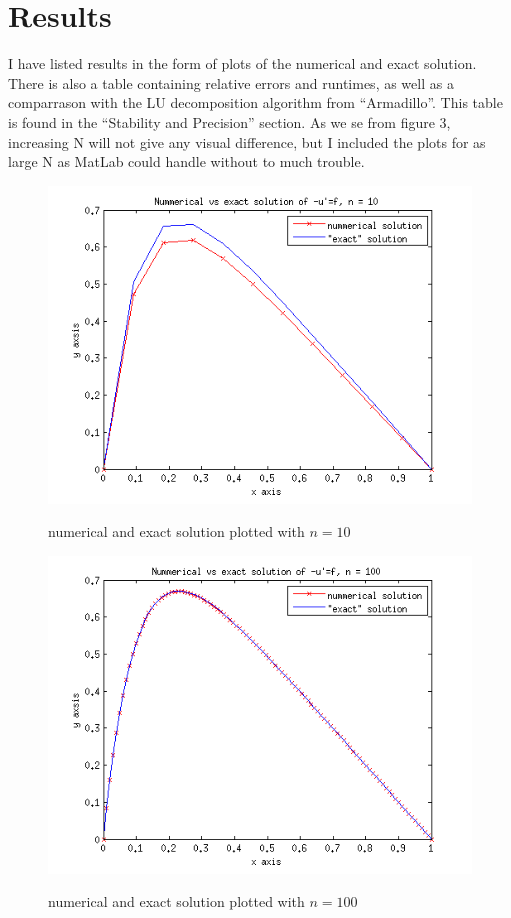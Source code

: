 \documentclass[a4paper,english, 10pt, twoside]{article}
\begin{document}
\section*{Results}
I have listed results in the form of plots of the numerical and exact solution. There is also a table containing relative errors 
and runtimes, as well as a comparrason with the LU decomposition algorithm from ``Armadillo''. This table is found in the
``Stability and Precision'' section. As we se from figure 3, increasing N will not give any visual difference, but I included
the plots for as large N as MatLab could handle without to much trouble.
\begin{figure}[H]
\begin{center}
 \includegraphics[scale=0.75]{plot_n10.png}\\
\caption{numerical and exact solution plotted with $n = 10$}
\end{center}
\end{figure}
\begin{figure}[H]
\begin{center}
 \includegraphics[scale=0.75]{plot_n100.png}\\
\caption{numerical and exact solution plotted with $n = 100$}
\end{center}
\end{figure}
\end{document}
